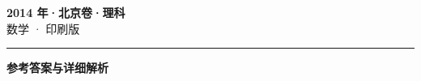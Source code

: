 \documentclass[zihao=5, a4paper]{ctexart}
\begin{document}
\begin{center}
  {\Large\bfseries 2014 年·北京卷·理科}\\[4pt]
  {\large 数学 · 印刷版}
\end{center}
\medskip
{}

\par\bigskip\hrule\bigskip
{}
\Needspace{0.55\textheight}
\begin{center}{\large\bfseries 参考答案与详细解析}\end{center}
\smallskip

\end{document}
